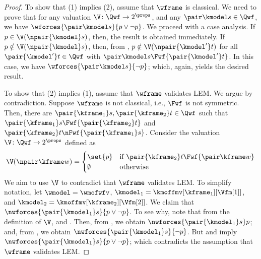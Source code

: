 \begin{proof}
    \setcounter{ieqnnum}{0}
    To show that (1) implies (2), assume that $\wframe$ is classical.
    We need to prove that for any valuation $\V \colon \Qwf \to 2^{\props}$, and any ${\pair \kmodel s} \in \Qwf$, we have $\wforces {\pair \kmodel s} {p \lor \lnot p}$.
    We proceed with a case analysis.
    If $p \in \V(\npair {\kmodel} s)$, then, the result is obtained immediately.
    If $p \notin \V(\npair {\kmodel} s)$, then, from , $p \notin \V(\npair {\kmodel'} t)$ for all ${\pair {\kmodel'} t} \in \Qwf$ with ${\pair \kmodel s} \Fwf {\pair {\kmodel'} t}$.
    In this case, we have $\wforces {\pair \kmodel s} {\lnot p}$; which, again, yields the desired result.
    
    \medskip
    \noindent
    To show that (2) implies (1), assume that $\wframe$ validates LEM.
    We argue by contradiction.
    Suppose $\wframe$ is not classical, i.e., $\Fwf$ is not symmetric.
    Then, there are ${\pair {\kframe_1} s},{\pair {\kframe_2} t} \in \Qwf$ such that ${\pair {\kframe_1} s} \Fwf {\pair {\kframe_2} t}$ and ${\pair {\kframe_2} t} \nFwf {\pair {\kframe_1} s}$.
    Consider the valuation ${\V \colon \Qwf \to 2^{\props}}$ defined as
    \[
        \V(\npair \kframe w) =
        \begin{cases}
            \set{p} & \mbox{if } {\pair {\kframe_2} t} \Fwf {\pair \kframe w} \\
            \emptyset & \mbox{otherwise}
        \end{cases}
    \]
    We aim to use $\V$ to contradict that $\wframe$ validates LEM.
    To simplify notation, let $\wmodel = \wmofwfv$, $\kmodel_1 = \kmoffmv[\kframe_1][{\Vfm[1]}]$, and $\kmodel_2 = \kmoffmv[\kframe_2][{\Vfm[2]}]$.
    We claim that $\nwforces {\pair {\kmodel_1} s} {p \lor \lnot p}$.
    To see why, note that from the definition of $\V$,  and .
    Then, from , we obtain $\nwforces {\pair {\kmodel_1} s} p$; and, from , we obtain $\nwforces {\pair {\kmodel_1} s} {\lnot p}$.
    But  and  imply $\nwforces {\pair {\kmodel_1} s} {p \lor \lnot p}$; which contradicts the assumption that $\wframe$ validates LEM.
\end{proof}